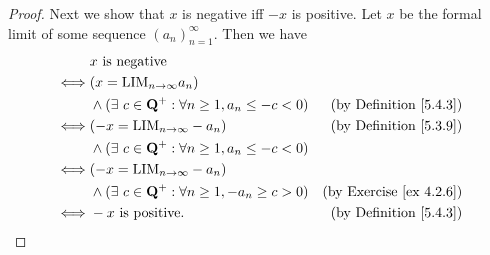\begin{proof}
    Next we show that \(x\) is negative iff \(-x\) is positive.
    Let \(x\) be the formal limit of some sequence \((a_n)_{n = 1}^{\infty}\).
    Then we have
    \begin{align*}
             & x \text{ is negative}                                                                                         \\
        \iff & (x = \text{LIM}_{n \to \infty} a_n)                                                                           \\
             & \land (\exists\ c \in \mathbf{Q}^+ : \forall n \geq 1, a_n \leq -c < 0) & \text{(by Definition \ref{5.4.3})}  \\
        \iff & (-x = \text{LIM}_{n \to \infty} -a_n)                                   & \text{(by Definition \ref{5.3.9})}  \\
             & \land (\exists\ c \in \mathbf{Q}^+ : \forall n \geq 1, a_n \leq -c < 0)                                       \\
        \iff & (-x = \text{LIM}_{n \to \infty} -a_n)                                                                         \\
             & \land (\exists\ c \in \mathbf{Q}^+ : \forall n \geq 1, -a_n \geq c > 0) & \text{(by Exercise \ref{ex 4.2.6})} \\
        \iff & -x \text{ is positive}.                                                 & \text{(by Definition \ref{5.4.3})}
    \end{align*}


\end{proof}
